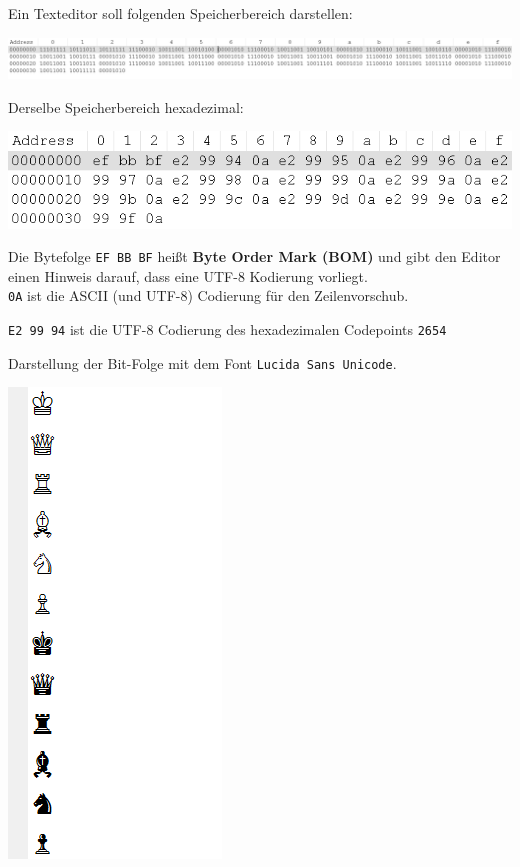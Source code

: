 \documentclass[10pt]{beamer}
\begin{document}
\begin{frame}[fragile]
Ein Texteditor soll folgenden Speicherbereich darstellen:

\includegraphics[scale=0.3]{bild4.png} \pause

Derselbe Speicherbereich hexadezimal:

\includegraphics[scale=0.5]{bild5.png}  

Die Bytefolge \texttt{EF BB BF} heißt \textbf{Byte Order Mark (BOM)} und gibt den Editor einen Hinweis darauf, dass
eine UTF-8 Kodierung vorliegt.   \\
\texttt{0A} ist die ASCII (und UTF-8) Codierung für den Zeilenvorschub. \pause

\texttt{E2 99 94} ist die UTF-8 Codierung des hexadezimalen Codepoints \texttt{2654} 


\end{frame}

\begin{frame}[fragile]
Darstellung der Bit-Folge mit dem Font \texttt{Lucida Sans Unicode}.


\includegraphics[scale=0.5]{bild7.png} 

\end{frame}

 
\end{document}
